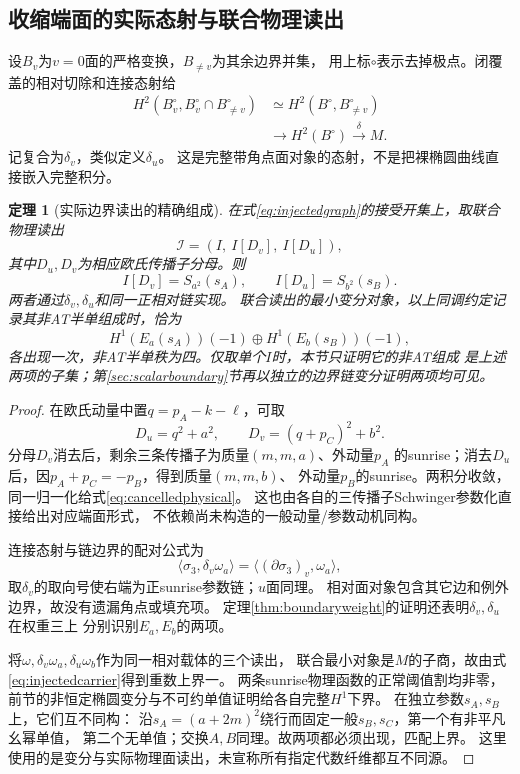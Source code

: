 \documentclass[11pt,a4paper]{ctexart}
\theoremstyle{cnplain}\newtheorem{theorem}{定理}[section]
\theoremstyle{definition}\newtheorem{definition}[theorem]{定义}
\theoremstyle{remark}\newtheorem{remark}[theorem]{注}
\begin{document}
\subsection{收缩端面的实际态射与联合物理读出}
设$B_v$为$v=0$面的严格变换，$B_{\ne v}$为其余边界并集，
用上标$\circ$表示去掉极点。闭覆盖的相对切除和连接态射给
\begin{equation}\label{eq:facemap}
\begin{split}
 H^2(B_v^\circ,B_v^\circ\cap B_{\ne v}^\circ)
 &\simeq H^2(B^\circ,B_{\ne v}^\circ)\\
 &\longrightarrow H^2(B^\circ)
 \overset\delta\longrightarrow M.
\end{split}
\end{equation}
记复合为$\delta_v$，类似定义$\delta_u$。
这是完整带角点面对象的态射，不是把裸椭圆曲线直接嵌入完整积分。

\begin{theorem}[实际边界读出的精确组成]\label{thm:jointsector}
在式\eqref{eq:injectedgraph}的接受开集上，取联合物理读出
\[
 \mathcal I=(I,\ I[D_v],\ I[D_u]),
\]
其中$D_u,D_v$为相应欧氏传播子分母。则
\begin{equation}\label{eq:cancelledphysical}
 I[D_v]=S_{a^2}(s_A),\qquad I[D_u]=S_{b^2}(s_B).
\end{equation}
两者通过$\delta_v,\delta_u$和同一正相对链实现。
联合读出的最小变分对象，以上同调约定记录其非AT半单组成时，恰为
\[
 H^1(E_a(s_A))(-1)\oplus H^1(E_b(s_B))(-1),
\]
各出现一次，非AT半单秩为四。仅取单个$I$时，本节只证明它的非AT组成
是上述两项的子集；第\ref{sec:scalarboundary}节再以独立的边界链变分证明两项均可见。
\end{theorem}
\begin{proof}
在欧氏动量中置$q=p_A-k-\ell$，可取
\[
 D_u=q^2+a^2,\qquad D_v=(q+p_C)^2+b^2.
\]
分母$D_v$消去后，剩余三条传播子为质量$(m,m,a)$、外动量$p_A$
的sunrise；消去$D_u$后，因$p_A+p_C=-p_B$，得到质量$(m,m,b)$、
外动量$p_B$的sunrise。两积分收敛，同一归一化给式\eqref{eq:cancelledphysical}。
这也由各自的三传播子Schwinger参数化直接给出对应端面形式，
不依赖尚未构造的一般动量/参数动机同构。

连接态射与链边界的配对公式为
\[
 \langle\sigma_3,\delta_v\omega_a\rangle
   =\langle(\partial\sigma_3)_v,\omega_a\rangle,
\]
取$\delta_v$的取向号使右端为正sunrise参数链；$u$面同理。
相对面对象包含其它边和例外边界，故没有遗漏角点或填充项。
定理\ref{thm:boundaryweight}的证明还表明$\delta_v,\delta_u$在权重三上
分别识别$E_a,E_b$的两项。

将$\omega,\delta_v\omega_a,\delta_u\omega_b$作为同一相对载体的三个读出，
联合最小对象是$M$的子商，故由式\eqref{eq:injectedcarrier}得到重数上界一。
两条sunrise物理函数的正常阈值割均非零，
前节的非恒定椭圆变分与不可约单值证明给各自完整$H^1$下界。
在独立参数$s_A,s_B$上，它们互不同构：
沿$s_A=(a+2m)^2$绕行而固定一般$s_B,s_C$，第一个有非平凡幺幂单值，
第二个无单值；交换$A,B$同理。故两项都必须出现，匹配上界。
这里使用的是变分与实际物理面读出，未宣称所有指定代数纤维都互不同源。
\end{proof}
\end{document}
